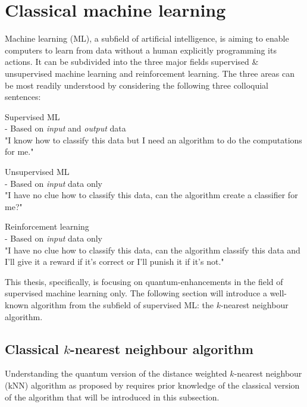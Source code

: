 
\section{Classical machine learning}
\label{subsec:classicalmachinelearning}

Machine learning (ML), a subfield of artificial intelligence, is aiming to enable computers to learn from data without a human explicitly programming its actions. It can be subdivided into the three major fields supervised \& unsupervised machine learning and reinforcement learning. The three areas can be most readily understood by considering the following three colloquial sentences:

\begin{redbox}
Supervised ML\\
- Based on \emph{input} and \emph{output} data\\
"I know how to classify this data but I need an algorithm to do the computations for me."
\end{redbox}
\begin{greenbox}
Unsupervised ML\\
- Based on \emph{input} data only\\
"I have no clue how to classify this data, can the algorithm create a classifier for me?"
\end{greenbox}
\begin{bluebox}
Reinforcement learning\\
- Based on \emph{input} data only\\
"I have no clue how to classify this data, can the algorithm classify this data and I'll give it a reward if it's correct or I'll punish it if it's not."
\end{bluebox}

This thesis, specifically, is focusing on quantum-enhancements in the field of supervised machine learning only. The following section will introduce a well-known algorithm from the subfield of supervised ML: the $k$-nearest neighbour algorithm.

\subsection{Classical $k$-nearest neighbour algorithm}
\label{subsubsec:knearestneighbour}

Understanding the quantum version of the distance weighted $k$-nearest neighbour (kNN) algorithm as proposed by  requires prior knowledge of the classical version of the algorithm that will be introduced in this subsection.

